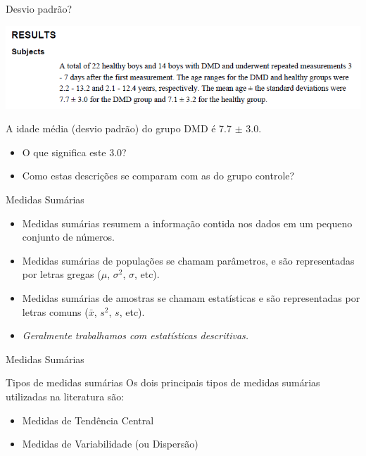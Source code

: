 \documentclass{beamer}
\begin{document}
\begin{frame}{Desvio padrão?}
  \begin{center}
    \includegraphics[width=1\textwidth]{Cap3/DP2}
  \end{center}

  \begin{block}{}
    A idade média (desvio padrão) do grupo DMD é 7.7 $\pm$ 3.0.

    \bigksip
    \begin{itemize}
    \item O que significa este 3.0?
    \item Como estas descrições se comparam com as do grupo controle?
    \end{itemize}
  \end{block}
\end{frame}

\begin{frame}{Medidas Sumárias}
  \begin{itemize}
  \item Medidas sumárias resumem a informação contida nos dados em um
    pequeno conjunto de números.
  \item Medidas sumárias de \alert{populações} se chamam
    \alert{parâmetros}, e são representadas por letras gregas ($\mu$, $\sigma^2$, $\sigma$, etc).
  \item Medidas sumárias de \alert{amostras} se chamam \alert{estatísticas} e são representadas por letras comuns ($\bar{x}$, $s^2$, $s$, etc).
  \item {\em Geralmente trabalhamos com estatísticas descritivas.}
  \end{itemize}
\end{frame}

\begin{frame}{Medidas Sumárias}
  \begin{block}{Tipos de medidas sumárias}
    Os dois principais tipos de medidas sumárias utilizadas na literatura são:
    \begin{itemize}
    \item Medidas de Tendência Central
    \item Medidas de Variabilidade (ou Dispersão)
    \end{itemize}
  \end{block}
\end{frame}
\end{document}
